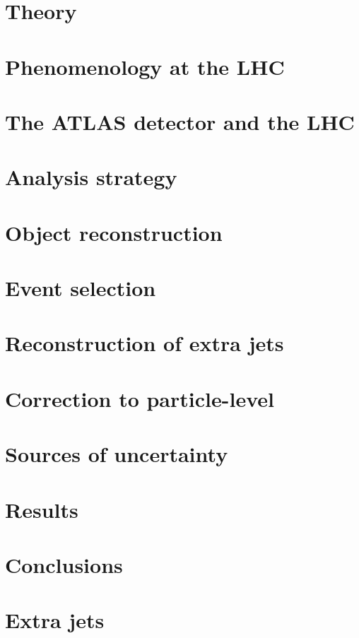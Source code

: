 \documentclass[12pt]{ucbthesis}
\begin{document}
\chapter{Theory}
\label{ch:theory}

\chapter{Phenomenology at the LHC}
\label{ch:pheno}

\chapter{The ATLAS detector and the LHC}
\label{ch:atlas}

\chapter{Analysis strategy}
\label{ch:strategy}

\chapter{Object reconstruction}
\label{ch:objects}

\chapter{Event selection}
\label{ch:event}

\chapter{Reconstruction of extra jets}
\label{ch:extrajets}

\chapter{Correction to particle-level}
\label{ch:unfolding}

\chapter{Sources of uncertainty}
\label{ch:syst}

\chapter{Results}
\label{ch:results}

\chapter{Conclusions}
\label{ch:conclusions}

\appendix
\chapter{Extra jets}
\end{document}
